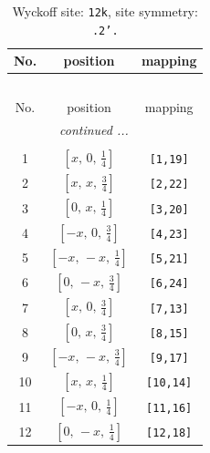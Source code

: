 \documentclass[fleqn,8pt]{jsarticle}
\begin{document}
\begin{longtable}{ccc}
\caption{Wyckoff site: {\tt 12k}, site symmetry: {\tt .2'.}}
 \\
 \hline \hline
No. & position & mapping \\ \hline \endfirsthead

\multicolumn{2}{l}{\tablename\ \thetable{}} \\
 \hline \hline
No. & position & mapping \\ \hline \endhead

 \hline \hline
\multicolumn{2}{r}{\footnotesize\it continued ...} \\ \endfoot

 \hline \hline
\multicolumn{2}{r}{} \\ \endlastfoot

1 & $\left[ x,\, 0,\, \frac{1}{4} \right]$ & {\tt [1,19]} \\ \hline
2 & $\left[ x,\, x,\, \frac{3}{4} \right]$ & {\tt [2,22]} \\ \hline
3 & $\left[ 0,\, x,\, \frac{1}{4} \right]$ & {\tt [3,20]} \\ \hline
4 & $\left[ - x,\, 0,\, \frac{3}{4} \right]$ & {\tt [4,23]} \\ \hline
5 & $\left[ - x,\, - x,\, \frac{1}{4} \right]$ & {\tt [5,21]} \\ \hline
6 & $\left[ 0,\, - x,\, \frac{3}{4} \right]$ & {\tt [6,24]} \\ \hline
7 & $\left[ x,\, 0,\, \frac{3}{4} \right]$ & {\tt [7,13]} \\ \hline
8 & $\left[ 0,\, x,\, \frac{3}{4} \right]$ & {\tt [8,15]} \\ \hline
9 & $\left[ - x,\, - x,\, \frac{3}{4} \right]$ & {\tt [9,17]} \\ \hline
10 & $\left[ x,\, x,\, \frac{1}{4} \right]$ & {\tt [10,14]} \\ \hline
11 & $\left[ - x,\, 0,\, \frac{1}{4} \right]$ & {\tt [11,16]} \\ \hline
12 & $\left[ 0,\, - x,\, \frac{1}{4} \right]$ & {\tt [12,18]} \\
\end{longtable}
\renewcommand{\arraystretch}{1.2}
\end{document}
